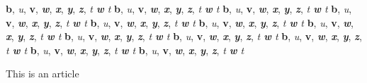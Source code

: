\textbf{b}, \emph{u}, \textbf{v}, \emph{\textbf{w}}, \emph{\textbf{x}}, \textbf{\emph{y}}, \textbf{\emph{z}}, \emph{t \textbf{w} t}
\textbf{b}, \emph{u}, \textbf{v}, \emph{\textbf{w}}, \emph{\textbf{x}}, \textbf{\emph{y}}, \textbf{\emph{z}}, \emph{t \textbf{w} t}
\textbf{b}, \emph{u}, \textbf{v}, \emph{\textbf{w}}, \emph{\textbf{x}}, \textbf{\emph{y}}, \textbf{\emph{z}}, \emph{t \textbf{w} t}
\textbf{b}, \emph{u}, \textbf{v}, \emph{\textbf{w}}, \emph{\textbf{x}}, \textbf{\emph{y}}, \textbf{\emph{z}}, \emph{t \textbf{w} t}
\textbf{b}, \emph{u}, \textbf{v}, \emph{\textbf{w}}, \emph{\textbf{x}}, \textbf{\emph{y}}, \textbf{\emph{z}}, \emph{t \textbf{w} t}
\textbf{b}, \emph{u}, \textbf{v}, \emph{\textbf{w}}, \emph{\textbf{x}}, \textbf{\emph{y}}, \textbf{\emph{z}}, \emph{t \textbf{w} t}
\textbf{b}, \emph{u}, \textbf{v}, \emph{\textbf{w}}, \emph{\textbf{x}}, \textbf{\emph{y}}, \textbf{\emph{z}}, \emph{t \textbf{w} t}
\textbf{b}, \emph{u}, \textbf{v}, \emph{\textbf{w}}, \emph{\textbf{x}}, \textbf{\emph{y}}, \textbf{\emph{z}}, \emph{t \textbf{w} t}
\textbf{b}, \emph{u}, \textbf{v}, \emph{\textbf{w}}, \emph{\textbf{x}}, \textbf{\emph{y}}, \textbf{\emph{z}}, \emph{t \textbf{w} t}
\textbf{b}, \emph{u}, \textbf{v}, \emph{\textbf{w}}, \emph{\textbf{x}}, \textbf{\emph{y}}, \textbf{\emph{z}}, \emph{t \textbf{w} t}
\textbf{b}, \emph{u}, \textbf{v}, \emph{\textbf{w}}, \emph{\textbf{x}}, \textbf{\emph{y}}, \textbf{\emph{z}}, \emph{t \textbf{w} t}
\textbf{b}, \emph{u}, \textbf{v}, \emph{\textbf{w}}, \emph{\textbf{x}}, \textbf{\emph{y}}, \textbf{\emph{z}}, \emph{t \textbf{w} t}

\begin{thebibliography}{0}

This is an article




\end{thebibliography}




